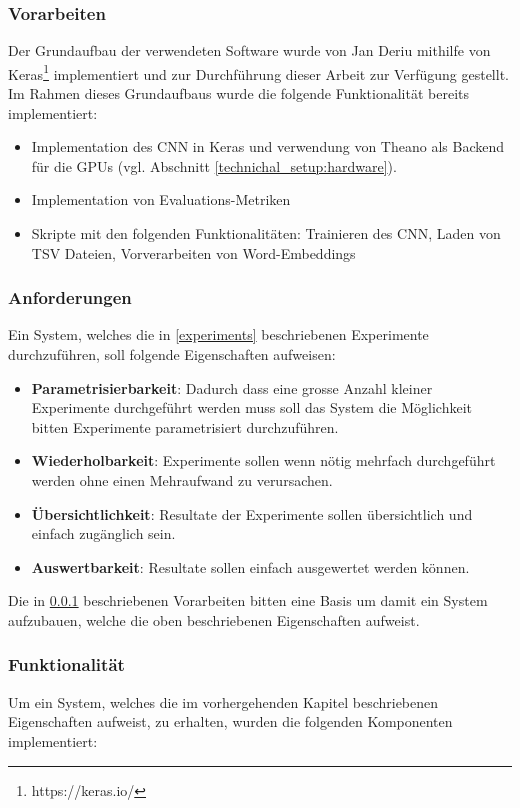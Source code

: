 \subsubsection{Vorarbeiten}
\label{technichal_setup:prework}
Der Grundaufbau der verwendeten Software wurde von Jan Deriu mithilfe von Keras\footnote{https://keras.io/} implementiert und zur Durchführung dieser Arbeit zur Verfügung gestellt. Im Rahmen dieses Grundaufbaus wurde die folgende Funktionalität bereits implementiert:

\begin{itemize}[noitemsep]
	\item Implementation des CNN in Keras und verwendung von Theano \cite{theanoCitShort} als Backend für die GPUs (vgl. Abschnitt \ref{technichal_setup:hardware}).
	\item Implementation von Evaluations-Metriken
	\item Skripte mit den folgenden Funktionalitäten: Trainieren des CNN, Laden von TSV Dateien, Vorverarbeiten von Word-Embeddings
\end{itemize}

\subsubsection{Anforderungen}
\label{technical_setup:requirements}
Ein System, welches die in \ref{experiments} beschriebenen Experimente durchzuführen, soll folgende Eigenschaften aufweisen:

\begin{itemize}
	\item \textbf{Parametrisierbarkeit}: Dadurch dass eine grosse Anzahl kleiner Experimente durchgeführt werden muss soll das System die Möglichkeit bitten Experimente parametrisiert durchzuführen.
	\item \textbf{Wiederholbarkeit}: Experimente sollen wenn nötig mehrfach durchgeführt werden ohne einen Mehraufwand zu verursachen. 
	\item \textbf{Übersichtlichkeit}: Resultate der Experimente sollen übersichtlich und einfach zugänglich sein.
	\item \textbf{Auswertbarkeit}: Resultate sollen  einfach ausgewertet werden können.
\end{itemize}

Die in \ref{technichal_setup:prework} beschriebenen Vorarbeiten bitten eine Basis um damit ein System aufzubauen, welche die oben beschriebenen Eigenschaften aufweist.
\subsubsection{Funktionalität}
\label{technical_setup:functionality}
Um ein System, welches die im vorhergehenden Kapitel beschriebenen Eigenschaften aufweist, zu erhalten, wurden die folgenden Komponenten implementiert:

